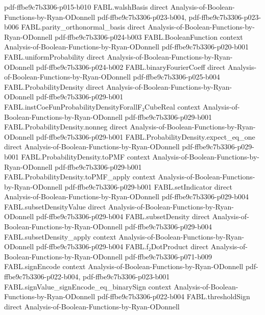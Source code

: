 \begin{theorem}
{    pdf-ffbe9c7b3306-p015-b010}
\proofstep
  {FABL.walshBasis}
  {direct}
  {Analysis-of-Boolean-Functions-by-Ryan-ODonnell}
  {pdf-ffbe9c7b3306-p023-b004,
    pdf-ffbe9c7b3306-p023-b006}
\proofstep
  {FABL.parity_orthonormal_basis}
  {direct}
  {Analysis-of-Boolean-Functions-by-Ryan-ODonnell}
  {pdf-ffbe9c7b3306-p024-b003}
\proofstep
  {FABL.BooleanFunction}
  {context}
  {Analysis-of-Boolean-Functions-by-Ryan-ODonnell}
  {pdf-ffbe9c7b3306-p020-b001}
\proofstep
  {FABL.uniformProbability}
  {direct}
  {Analysis-of-Boolean-Functions-by-Ryan-ODonnell}
  {pdf-ffbe9c7b3306-p024-b002}
\proofstep
  {FABL.binaryFourierCoeff}
  {direct}
  {Analysis-of-Boolean-Functions-by-Ryan-ODonnell}
  {pdf-ffbe9c7b3306-p025-b004}
\proofstep
  {FABL.ProbabilityDensity}
  {direct}
  {Analysis-of-Boolean-Functions-by-Ryan-ODonnell}
  {pdf-ffbe9c7b3306-p029-b001}
\proofstep
  {FABL.instCoeFunProbabilityDensityForallF₂CubeReal}
  {context}
  {Analysis-of-Boolean-Functions-by-Ryan-ODonnell}
  {pdf-ffbe9c7b3306-p029-b001}
\proofstep
  {FABL.ProbabilityDensity.nonneg}
  {direct}
  {Analysis-of-Boolean-Functions-by-Ryan-ODonnell}
  {pdf-ffbe9c7b3306-p029-b001}
\proofstep
  {FABL.ProbabilityDensity.expect_eq_one}
  {direct}
  {Analysis-of-Boolean-Functions-by-Ryan-ODonnell}
  {pdf-ffbe9c7b3306-p029-b001}
\proofstep
  {FABL.ProbabilityDensity.toPMF}
  {context}
  {Analysis-of-Boolean-Functions-by-Ryan-ODonnell}
  {pdf-ffbe9c7b3306-p029-b001}
\proofstep
  {FABL.ProbabilityDensity.toPMF_apply}
  {context}
  {Analysis-of-Boolean-Functions-by-Ryan-ODonnell}
  {pdf-ffbe9c7b3306-p029-b001}
\proofstep
  {FABL.setIndicator}
  {direct}
  {Analysis-of-Boolean-Functions-by-Ryan-ODonnell}
  {pdf-ffbe9c7b3306-p029-b004}
\proofstep
  {FABL.subsetDensityValue}
  {direct}
  {Analysis-of-Boolean-Functions-by-Ryan-ODonnell}
  {pdf-ffbe9c7b3306-p029-b004}
\proofstep
  {FABL.subsetDensity}
  {direct}
  {Analysis-of-Boolean-Functions-by-Ryan-ODonnell}
  {pdf-ffbe9c7b3306-p029-b004}
\proofstep
  {FABL.subsetDensity_apply}
  {context}
  {Analysis-of-Boolean-Functions-by-Ryan-ODonnell}
  {pdf-ffbe9c7b3306-p029-b004}
\proofstep
  {FABL.f₂DotProduct}
  {direct}
  {Analysis-of-Boolean-Functions-by-Ryan-ODonnell}
  {pdf-ffbe9c7b3306-p071-b009}
\proofstep
  {FABL.signEncode}
  {context}
  {Analysis-of-Boolean-Functions-by-Ryan-ODonnell}
  {pdf-ffbe9c7b3306-p022-b004,
    pdf-ffbe9c7b3306-p023-b001}
\proofstep
  {FABL.signValue_signEncode_eq_binarySign}
  {context}
  {Analysis-of-Boolean-Functions-by-Ryan-ODonnell}
  {pdf-ffbe9c7b3306-p022-b004}
\proofstep
  {FABL.thresholdSign}
  {direct}
  {Analysis-of-Boolean-Functions-by-Ryan-ODonnell}

\end{theorem}
